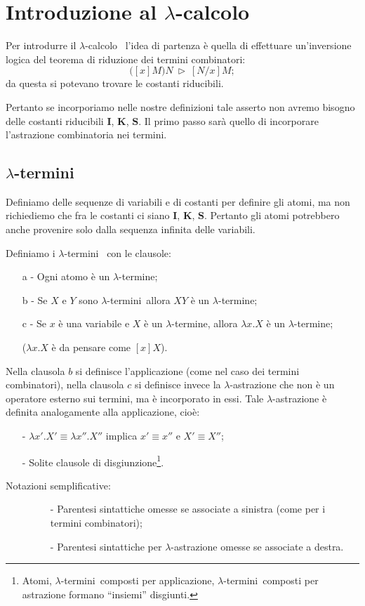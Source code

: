 \documentclass{book}
\newcommand*{\ii}{\mathbf{I}}    %
\newcommand*{\kk}{\mathbf{K}}    %
\newcommand*{\sss}{\mathbf{S}}   %
\newcommand*{\lbc}{$\lambda$-cal\-co\-lo}
\newcommand*{\lbt}{$\lambda$-ter\-mi\-ne}
\newcommand*{\lbts}{$\lambda$-ter\-mi\-ni}
\begin{document}
\chapter{Introduzione al \lbc}
Per introdurre il \lbc~ l'idea di partenza \`e quella di effettuare 
un'inversione logica del teorema di riduzione dei termini combinatori:
\[
\bigl([x]M\bigr)N \ \vartriangleright \ [N/x]M;
\]
da questa si potevano trovare le costanti riducibili. 

Pertanto se incorporiamo 
nelle nostre definizioni tale asserto non avremo bisogno delle costanti
riducibili $\ii$, $\kk$, $\sss$. Il primo passo sar\`a quello di incorporare
l'astrazione combinatoria nei termini.

\section{\lbts}
Definiamo delle sequenze di variabili e di costanti per definire gli atomi, ma 
non richiediemo che fra le costanti ci siano  $\ii$, $\kk$, $\sss$. Pertanto
gli atomi potrebbero anche provenire solo dalla sequenza infinita delle 
variabili.

Definiamo i \lbts~ con le clausole:

\begin{enumerate}
\item[a -]Ogni atomo \`e un \lbt;
\item[b -]Se $X$ e $Y$ sono \lbts ~allora $XY$ \`e un \lbt;
\item[c -]Se $x$ \`e una variabile e $X$ \`e un \lbt, allora $\lambda x.X$ \`e
un \lbt;
\item[]($\lambda x.X$ \`e da pensare come $[x]X$).
\end{enumerate}
Nella clausola $b$ si definisce l'applicazione (come nel caso dei termini 
combinatori), nella clausola $c$ si definisce invece la $\lambda$-astrazione 
che non \`e un operatore esterno sui termini, ma \`e incorporato in essi. Tale
$\lambda$-astrazione \`e definita analogamente alla applicazione, cio\`e:
\begin{enumerate}
\item[-]$\lambda x'.X' \equiv \lambda x''.X''$ implica $x' \equiv x'' 
\text{ e } X' \equiv X''$;
\item[-]Solite clausole di disgiunzione\footnote{Atomi, \lbts ~composti per 
applicazione, \lbts ~composti per astrazione formano ``insiemi'' disgiunti.}.
\end{enumerate}
\begin{description}\item[Notazioni semplificative:]
\begin{enumerate}
\item[-]Parentesi sintattiche omesse se associate a sinistra (come per i 
termini combinatori); 
\item[-]Parentesi sintattiche per $\lambda$-astrazione omesse se associate a 
destra.
\end{enumerate}
\end{description}
\end{document}

